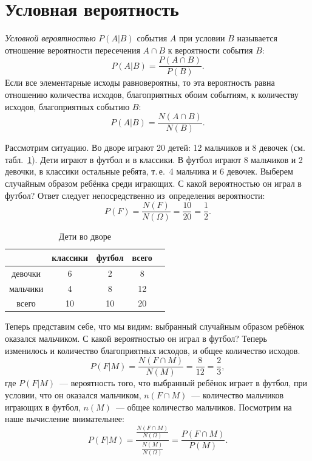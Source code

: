\documentclass[11pt]{article}
\begin{document}
\section{Условная вероятность}

\begin{definition}
	\emph{Условной вероятностью} $P(A|B)$ события $A$ при условии $B$ называется отношение вероятности пересечения $A\cap B$ к вероятности события $B$:
	$$
	P(A|B)=\frac{P(A\cap B)}{P(B)}.
	$$
	Если все элементарные исходы равновероятны, то эта вероятность равна отношению количества исходов, благоприятных обоим событиям, к количеству исходов, благоприятных событию $B$:
	$$
	P(A|B)=\frac{N(A\cap B)}{N(B)}.
	$$
\end{definition}

Рассмотрим ситуацию. Во дворе играют 20 детей: 12 мальчиков и 8 девочек (см.
табл.~\ref{deti}). Дети играют в футбол и в классики. В футбол играют 8 мальчиков и 2 девочки, в классики остальные ребята, т.\,е.~4 мальчика и 6 девочек. Выберем случайным образом ребёнка среди играющих. С какой вероятностью он играл в футбол? Ответ следует непосредственно из~определения вероятности:
$$
P(F)=\frac{N(F)}{N(\Omega)}=\frac{10}{20}=\frac{1}{2}.
$$

\begin{table}[b]
	\begin{center}
		\begin{tabular}{|c|c|c|c|c|}
			\hline
			& классики & футбол & всего \\
			\hline
			девочки & 6 & 2 & 8 \\
			\hline
			мальчики & 4 & 8 & 12 \\
			\hline
			всего & 10 & 10 & 20 \\
			\hline
		\end{tabular}
		\caption{Дети во дворе}\label{deti}
	\end{center}
\end{table}
Теперь представим себе, что мы видим: выбранный случайным образом ребёнок оказался мальчиком. С какой вероятностью он играл в футбол? Теперь изменилось и количество благоприятных исходов, и общее количество исходов.
$$
P(F|M)=\frac{N(F\cap M)}{N(M)}=\frac{8}{12}=\frac{2}{3},
$$
где $P(F|M)$~--- вероятность того, что выбранный ребёнок играет в футбол, при условии, что он оказался мальчиком, $n(F\cap M)$~--- количество мальчиков играющих в футбол, $n(M)$~--- общее количество мальчиков. Посмотрим на наше вычисление внимательнее:
$$
P(F|M)=\frac{\frac{N(F\cap M)}{N(\Omega)}}{\frac{N(M)}{N(\Omega)}}=\frac{P(F\cap M)}{P(M)}.
$$
\end{document}

